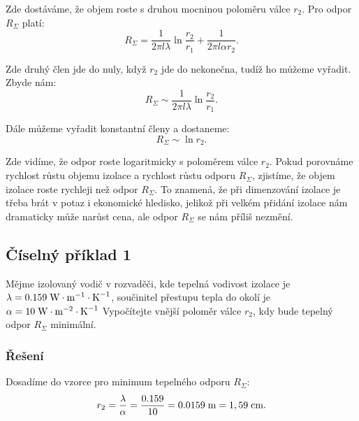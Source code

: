 \documentclass{article}
\begin{document}
Zde dostáváme, že objem roste s druhou mocninou poloměru válce $r_2$. Pro odpor $R_\Sigma$ platí:
$$
    R_\Sigma = \frac{1}{2 \pi l \lambda} \ln \frac{r_2}{r_1} + \frac{1}{2 \pi l \alpha r_2}.
$$

Zde druhý člen jde do nuly, když $r_2$ jde do nekonečna, tudíž ho můžeme vyřadit. Zbyde nám:
$$
    R_\Sigma \sim \frac{1}{2 \pi l \lambda} \ln \frac{r_2}{r_1}.
$$

Dále můžeme vyřadit konstantní členy a dostaneme:
$$
    R_\Sigma \sim \ln r_2.
$$

Zde vidíme, že odpor roste logaritmicky s poloměrem válce $r_2$. Pokud porovnáme rychlost růstu objemu izolace a rychlost růstu odporu $R_\Sigma$, zjistíme, že objem izolace roste rychleji než odpor $R_\Sigma$. To znamená, že při dimenzování izolace je třeba brát v potaz i ekonomické hledisko, jelikož při velkém přidání izolace nám dramaticky může narůst cena, ale odpor $R_\Sigma$ se nám příliš nezmění.

\begin{center}
\end{center}


\subsection{Číselný příklad 1 \spicy \spicy}
Mějme izolovaný vodič v rozvaděči, kde tepelná vodivost izolace je $\lambda = 0.159 \; \textrm{W} \cdot \textrm{m}^{-1} \cdot \textrm{K}^{-1}$, součinitel přestupu tepla do okolí je $\alpha = 10 \; \textrm{W} \cdot \textrm{m}^{-2} \cdot \textrm{K}^{-1}$ Vypočítejte vnější poloměr válce $r_2$, kdy bude tepelný odpor $R_\Sigma$ minimální.

\subsubsection{Řešení}
Dosadíme do vzorce pro minimum tepelného odporu $R_\Sigma$:
$$
    r_2 = \frac{\lambda}{\alpha} = \frac{0.159}{10} = 0.0159 \; \textrm{m} = 1,59 \; \textrm{cm}.
$$
\end{document}
